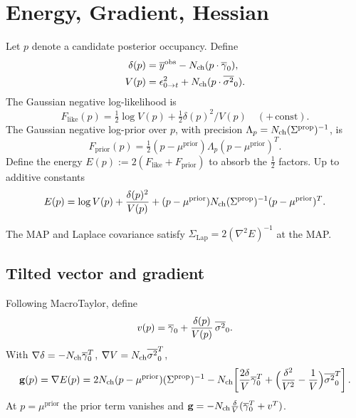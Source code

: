 \documentclass[11pt]{article}
\begin{document}
\section{Energy, Gradient, Hessian}

Let $p$ denote a candidate posterior occupancy. Define
\begin{align}
  \delta(p) &= \overline{y}^{\mathrm{obs}} - N_{\mathrm{ch}}(p\cdot\overline{\gamma}_0),\\
  V(p)      &= \epsilon^2_{0\to t} + N_{\mathrm{ch}}(p\cdot\overline{\sigma^2}_0).
\end{align}
The Gaussian negative log-likelihood is
\[
  F_{\mathrm{like}}(p)
  = \tfrac12\log V(p) + \tfrac12\delta(p)^2/V(p)
  \quad(+\,\text{const}).
\]
The Gaussian negative log-prior over $p$, with precision
$\Lambda_p=N_{\mathrm{ch}}(\Sigma^{\mathrm{prop}})^{-1}$, is
\[
  F_{\mathrm{prior}}(p)
  = \tfrac12(p-\mu^{\mathrm{prior}})\Lambda_p(p-\mu^{\mathrm{prior}})^{T}.
\]
Define the energy $E(p):=2(F_{\mathrm{like}}+F_{\mathrm{prior}})$ to
absorb the $\tfrac12$ factors. Up to additive constants
\begin{equation}
  E(p) = \log V(p) + \frac{\delta(p)^2}{V(p)}
  + (p-\mu^{\mathrm{prior}})N_{\mathrm{ch}}(\Sigma^{\mathrm{prop}})^{-1}(p-\mu^{\mathrm{prior}})^{T}.
  \label{eq:E}
\end{equation}

The MAP and Laplace covariance satisfy
$\Sigma_{\mathrm{Lap}}=2(\nabla^2 E)^{-1}$ at the MAP.

\subsection{Tilted vector and gradient}

Following MacroTaylor, define
\begin{equation}
  v(p) = \overline{\gamma}_0 + \frac{\delta(p)}{V(p)}\,\overline{\sigma^2}_0.
  \label{eq:vdef}
\end{equation}
With $\nabla\delta=-N_{\mathrm{ch}}\overline{\gamma}_0^{T}$, $\nabla V=N_{\mathrm{ch}}\overline{\sigma^2}_0^{T}$,
\begin{equation}
  \mathbf{g}(p) = \nabla E(p)
  = 2N_{\mathrm{ch}}(p-\mu^{\mathrm{prior}})(\Sigma^{\mathrm{prop}})^{-1}
  - N_{\mathrm{ch}}\!\left[\frac{2\delta}{V}\overline{\gamma}_0^{T}
                  +\Big(\frac{\delta^2}{V^2}-\frac{1}{V}\Big)\overline{\sigma^2}_0^{T}\right].
  \label{eq:grad}
\end{equation}
At $p=\mu^{\mathrm{prior}}$ the prior term vanishes and
$\mathbf{g}=-N_{\mathrm{ch}}\frac{\delta}{V}(\overline{\gamma}_0^{T}+v^{T})$.
\end{document}
